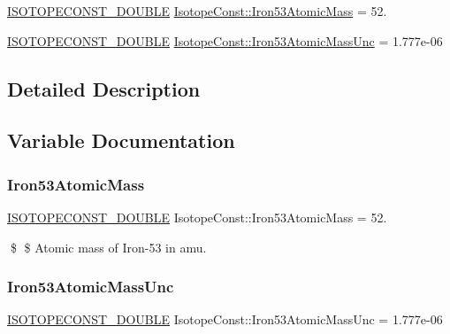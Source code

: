 \begin{DoxyCompactItemize}
\item 
\mbox{\hyperlink{group___isotope_const-_macros_ga8f45a7272ce02c0b4c65c44636ed719a}{I\+S\+O\+T\+O\+P\+E\+C\+O\+N\+S\+T\+\_\+\+D\+O\+U\+B\+LE}} \mbox{\hyperlink{group___isotope_const-_iron-_fe53_ga06a44c8ff65749ba2e0a8121c744fb07}{Isotope\+Const\+::\+Iron53\+Atomic\+Mass}} = 52.
\item 
\mbox{\hyperlink{group___isotope_const-_macros_ga8f45a7272ce02c0b4c65c44636ed719a}{I\+S\+O\+T\+O\+P\+E\+C\+O\+N\+S\+T\+\_\+\+D\+O\+U\+B\+LE}} \mbox{\hyperlink{group___isotope_const-_iron-_fe53_ga6c0d4cba62d79b2aaf6fe64907b12ff7}{Isotope\+Const\+::\+Iron53\+Atomic\+Mass\+Unc}} = 1.\+777e-\/06
\end{DoxyCompactItemize}


\subsection{Detailed Description}


\subsection{Variable Documentation}
\mbox{\label{group___isotope_const-_iron-_fe53_ga06a44c8ff65749ba2e0a8121c744fb07}} 
\subsubsection{\texorpdfstring{Iron53\+Atomic\+Mass}{Iron53AtomicMass}}
{\footnotesize\ttfamily \mbox{\hyperlink{group___isotope_const-_macros_ga8f45a7272ce02c0b4c65c44636ed719a}{I\+S\+O\+T\+O\+P\+E\+C\+O\+N\+S\+T\+\_\+\+D\+O\+U\+B\+LE}} Isotope\+Const\+::\+Iron53\+Atomic\+Mass = 52.}

\$ \$ Atomic mass of Iron-\/53 in amu. \mbox{\label{group___isotope_const-_iron-_fe53_ga6c0d4cba62d79b2aaf6fe64907b12ff7}} 
\subsubsection{\texorpdfstring{Iron53\+Atomic\+Mass\+Unc}{Iron53AtomicMassUnc}}
{\footnotesize\ttfamily \mbox{\hyperlink{group___isotope_const-_macros_ga8f45a7272ce02c0b4c65c44636ed719a}{I\+S\+O\+T\+O\+P\+E\+C\+O\+N\+S\+T\+\_\+\+D\+O\+U\+B\+LE}} Isotope\+Const\+::\+Iron53\+Atomic\+Mass\+Unc = 1.\+777e-\/06}

